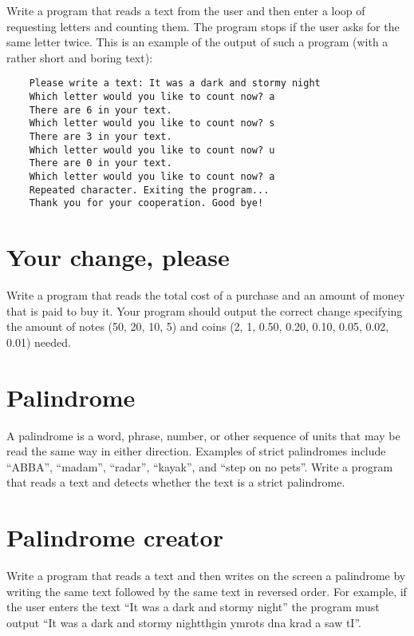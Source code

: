 \documentclass{article}
\begin{document}
Write a program that reads a text from the user and then enter a loop
of requesting letters and counting them. The program stops if the user
asks for the same letter twice. This is an example of the output of
such a program (with a rather short and boring text): 

\begin{verbatim}
    Please write a text: It was a dark and stormy night
    Which letter would you like to count now? a
    There are 6 in your text. 
    Which letter would you like to count now? s
    There are 3 in your text. 
    Which letter would you like to count now? u
    There are 0 in your text. 
    Which letter would you like to count now? a
    Repeated character. Exiting the program...
    Thank you for your cooperation. Good bye!
\end{verbatim}

\section{Your change, please}
\label{sec:your-change-please}

Write a program that reads the total cost of a purchase and an amount
of money that is paid to buy it. Your program should output the
correct change specifying the amount of notes (50, 20, 10, 5) and
coins (2, 1, 0.50, 0.20, 0.10, 0.05, 0.02, 0.01) needed. 


\section{Palindrome}
\label{sec:palindrome}

A palindrome is a word, phrase, number, or other sequence of units
that may be read the same way in either direction. Examples of strict
palindromes include ``ABBA'', ``madam'', ``radar'', ``kayak'', and
``step on no pets''. Write a program
that reads a text and detects whether the text is a strict palindrome.

\section{Palindrome creator}
\label{sec:palindrome-creator}

Write a program that reads a text and then writes on the screen a
palindrome by writing the same text followed by the same text in
reversed order. For example, if the user enters the text ``It was a
dark and stormy night'' the program must output ``It was a dark and
stormy nightthgin ymrots dna krad a saw tI''. 
\end{document}
